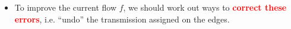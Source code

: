 \documentclass[mathserif]{beamer}
\begin{document}
{\begin{itemize}
\begin{itemize}
\begin{figure}
\begin{tikzpicture}[scale=1, auto,swap]
        
%
%        
%        
%        
%        
%        
%
%       
        
   \end{tikzpicture}
\end{figure}

 \item 
  To improve the current flow $f$, we should work out ways to \textcolor{red}{\bf correct these errors}, i.e. ``undo'' the transmission assigned on the edges. 
\end{itemize}
\end{itemize}

} 
\end{document}
